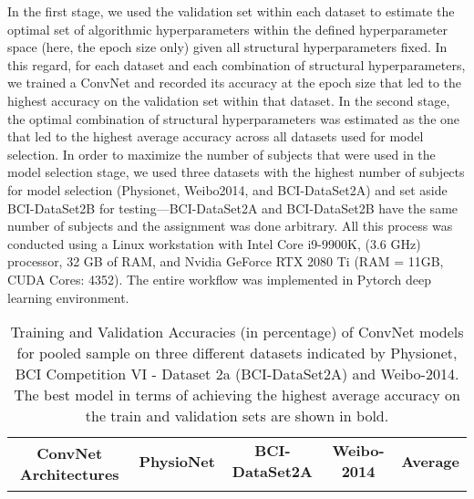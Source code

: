 \documentclass{ieeeaccess}
\newcommand{\ra}[1]{\renewcommand{\arraystretch}{#1}}
\begin{document}
{{    In the first stage, we used the validation set within each dataset to estimate the optimal set of algorithmic hyperparameters within the defined hyperparameter space (here, the epoch size only) given all structural hyperparameters fixed. In this regard, for each dataset and each combination of structural hyperparameters, we trained a ConvNet and recorded its accuracy at the epoch size that led to the highest accuracy on the validation set within that dataset. In the second stage, the optimal combination of structural hyperparameters was estimated as the one that led to the highest average accuracy across all datasets used for model selection.}  In order to maximize the number of subjects that were used in the model selection stage, we used three datasets with the highest number of subjects for model selection (Physionet, Weibo2014, and BCI-DataSet2A) and set aside BCI-DataSet2B for testing---BCI-DataSet2A and BCI-DataSet2B have the same number of subjects and the assignment was done arbitrary.  All this process was conducted using a Linux workstation with Intel Core i9-9900K, (3.6 GHz) processor,  32 GB of RAM, and Nvidia GeForce RTX 2080 Ti (RAM = 11GB,  CUDA Cores: 4352). The entire workflow was implemented in Pytorch deep learning environment.
    
\begin{table*}[htb]  
	\centering\ra{1.2}
	\caption{Training and Validation Accuracies (in percentage) of ConvNet models for pooled sample on three different datasets indicated by Physionet, BCI Competition VI - Dataset 2a (BCI-DataSet2A) and Weibo-2014. The best model in terms of achieving the highest average accuracy on the train and validation sets are shown in bold.} 
	\label{tab:valPool_acc}
	\setlength{\tabcolsep}{8pt} 
	
	\begin{tabular}{|l|cc|cc|cc|cc|}

		\toprule
		\multicolumn{1}{|c|}{\multirow{2}{*}{\textbf{ConvNet Architectures}}} & \multicolumn{2}{c|}{\textbf{PhysioNet}} & \multicolumn{2}{c|}{\textbf{BCI-DataSet2A}} & \multicolumn{2}{c|}{\textbf{Weibo-2014}} & \multicolumn{2}{c|}{\textbf{Average}} \\ %
		\multicolumn{1}{|l|}{}   
		

\end{tabular}
\end{table*}}
\end{document}
